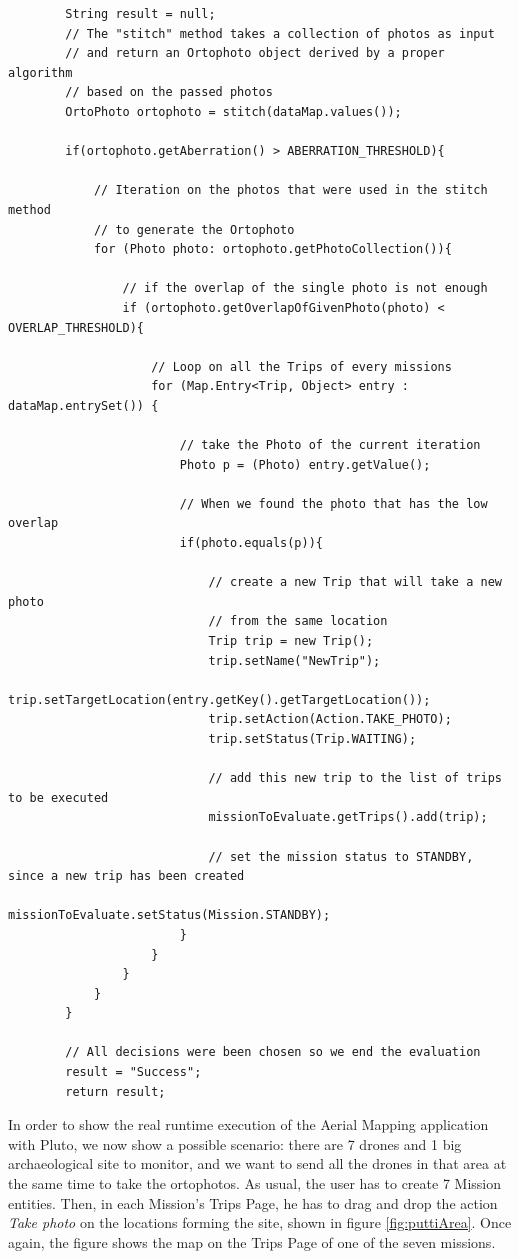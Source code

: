 \begin{lstlisting}
		String result = null;
		// The "stitch" method takes a collection of photos as input
        // and return an Ortophoto object derived by a proper algorithm
        // based on the passed photos
		OrtoPhoto ortophoto = stitch(dataMap.values());
		
		if(ortophoto.getAberration() > ABERRATION_THRESHOLD){
			
			// Iteration on the photos that were used in the stitch method
            // to generate the Ortophoto
			for (Photo photo: ortophoto.getPhotoCollection()){
				
				// if the overlap of the single photo is not enough
				if (ortophoto.getOverlapOfGivenPhoto(photo) < OVERLAP_THRESHOLD){
					
					// Loop on all the Trips of every missions
					for (Map.Entry<Trip, Object> entry : dataMap.entrySet()) {
						
						// take the Photo of the current iteration
						Photo p = (Photo) entry.getValue();
						
						// When we found the photo that has the low overlap
						if(photo.equals(p)){
							
							// create a new Trip that will take a new photo
                            // from the same location
							Trip trip = new Trip();
							trip.setName("NewTrip");
							trip.setTargetLocation(entry.getKey().getTargetLocation());
							trip.setAction(Action.TAKE_PHOTO);
							trip.setStatus(Trip.WAITING);

							// add this new trip to the list of trips to be executed
							missionToEvaluate.getTrips().add(trip);
							
							// set the mission status to STANDBY, since a new trip has been created
							missionToEvaluate.setStatus(Mission.STANDBY);
						}
					}		
				}
			}
		}
        
        // All decisions were been chosen so we end the evaluation
		result = "Success";
		return result;
\end{lstlisting}

In order to show the real runtime execution of the Aerial Mapping application with Pluto, we now show a possible scenario:
there are 7 drones and 1 big archaeological site to monitor, and we want to send all the drones in that area at the same time to take the ortophotos.
As usual, the user has to create 7 Mission entities.
Then, in each Mission's Trips Page, he has to drag and drop the action \textit{Take photo} on the locations forming the site, shown in figure \ref{fig:puttiArea}.
Once again, the figure shows the map on the Trips Page of one of the seven missions.

